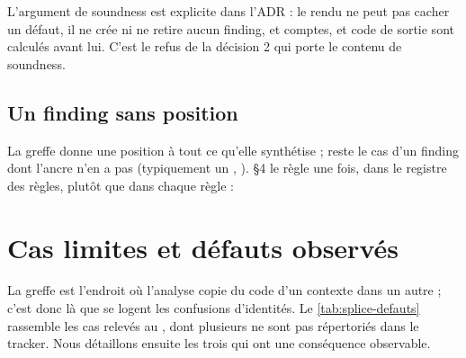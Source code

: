 L'argument de soundness est explicite dans l'ADR : le rendu ne peut pas cacher un défaut, il ne crée ni ne retire aucun finding, et comptes,  et code de sortie sont calculés avant lui. C'est le refus de la décision 2 qui porte le contenu de soundness.

\subsection{Un finding sans position}

La greffe donne une position à tout ce qu'elle synthétise ; reste le cas d'un finding dont l'ancre n'en a pas (typiquement un , ).  §4 le règle une fois, dans le registre des règles, plutôt que dans chaque règle :


\section{Cas limites et défauts observés}
\label{sec:splice-limites}

La greffe est l'endroit où l'analyse copie du code d'un contexte dans un autre ; c'est donc là que se logent les confusions d'identités. Le \cref{tab:splice-defauts} rassemble les cas relevés au \snapshotCommit{}, dont plusieurs ne sont pas répertoriés dans le tracker. Nous détaillons ensuite les trois qui ont une conséquence observable.

